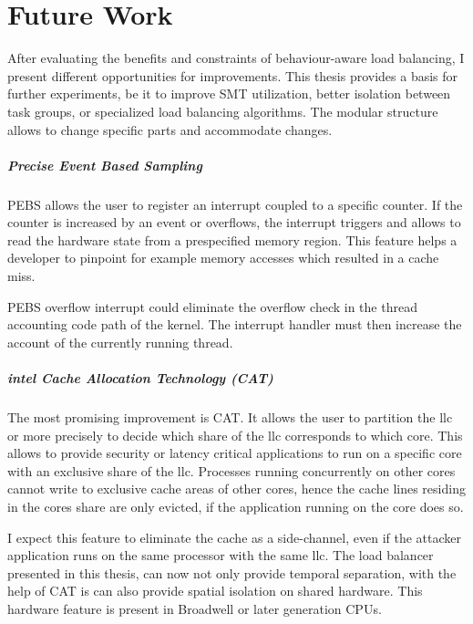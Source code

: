 \chapter{Future Work}
\label{sec:futurework}

After evaluating the benefits and constraints of behaviour-aware load
balancing, I present different opportunities for improvements.
This thesis provides a basis for further experiments, be it to improve SMT
utilization, better isolation between task groups, or specialized load
balancing algorithms.
The modular structure allows to change specific parts and accommodate changes.

\paragraph{Precise Event Based Sampling}
PEBS allows the user to register an interrupt coupled to a specific counter.
If the counter is increased by an event or overflows, the interrupt triggers
and allows to read the hardware state from a prespecified memory region.
This feature helps a developer to pinpoint for example memory accesses which
resulted in a cache miss.

PEBS overflow interrupt could eliminate the overflow check in the thread
accounting code path of the kernel.
The interrupt handler must then increase the account of the currently running
thread.

\paragraph{\gls{intel} Cache Allocation Technology (CAT)}
The most promising improvement is CAT.
It allows the user to partition the \gls{llc} or more precisely to decide
which share of the \gls{llc} corresponds to which core.
This allows to provide security or latency critical applications to run on a
specific core with an exclusive share of the \gls{llc}.
Processes running concurrently on other cores cannot write to exclusive
cache areas of other cores, hence the cache lines residing in the cores share
are only evicted, if the application running on the core does so.

I expect this feature to eliminate the cache as a side-channel, even if the
attacker application runs on the same processor with the same \gls{llc}.
The load balancer presented in  this thesis, can now not only provide temporal
separation, with the help of CAT is can also provide spatial isolation on
shared hardware.
This hardware feature is present in Broadwell or later generation CPUs.

